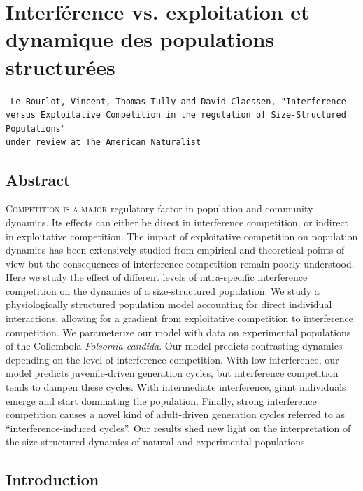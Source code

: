\chapter[Interférence vs. exploitation et dynamique des populations
structurées][Interférence et populations structurées]{Interférence vs.
exploitation et dynamique des populations structurées}

\vspace{2cm}
\begin{Spacing}{1}
\texttt{
Le Bourlot, Vincent, Thomas Tully and David Claessen, "Interference versus
Exploitative Competition in the regulation of Size-Structured Populations"\\
under review at The American Naturalist
}
\end{Spacing}


\section*{Abstract}

\lettrine[lines=3]{C}{ompetition is a major} regulatory factor in population
and community dynamics.
Its effects can either be direct in interference competition, or indirect in
exploitative competition. The impact of exploitative competition on population
dynamics has been extensively studied from empirical and theoretical points of
view but the consequences of interference competition remain poorly understood.
Here we study the effect of different levels of intra-specific interference
competition on the dynamics of a size-structured population. We study a
physiologically structured population model accounting for direct individual
interactions, allowing for a gradient from exploitative competition to
interference competition. We parameterize our model with data on experimental
populations of the Collembola \textit{Folsomia candida}. Our model predicts
contrasting dynamics depending on the level of interference competition. With low
interference, our model predicts juvenile-driven generation cycles, but
interference competition tends to dampen these cycles. With intermediate
interference, giant individuals emerge and start dominating the population.
Finally, strong interference competition causes a novel kind of adult-driven
generation cycles referred to as “interference-induced cycles”. Our results shed
new light on the interpretation of the size-structured dynamics of natural and
experimental populations.

\section{Introduction}

